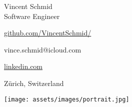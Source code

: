 \vspace{0pt}
\begin{minipage}[t]{0.6\textwidth}
    {\sectionfont\fontsize{20}{30}\selectfont\color{black}
        Vincent Schmid\\[0.2em]
    }
    {\sectionfont\fontsize{13}{14}\selectfont\color{altColor}
        Software Engineer\\[0.6em]
    }
    \begin{minipage}[t]{0.58\linewidth}
        \begin{description}[labelwidth=1em]
            \item[\faGithub\color{altColor}] \href{https://github.com/VincentSchmid/}{github.com/VincentSchmid/}
            \item[\faEnvelopeO\color{altColor}] vince.schmid@icloud.com
        \end{description}
        \vspace{.5em}
    \end{minipage}
    \hfill
    \begin{minipage}[t]{0.38\linewidth}
        \begin{description}[labelwidth=1em]
            \item[\faLinkedin\color{altColor}] \href{https://www.linkedin.com/in/vincent-schmid-b931787a/}{linkedin.com}
            \item[\faMapMarker\color{altColor}] Zürich, Switzerland
        \end{description}
    \end{minipage}
\end{minipage}
\hfill
\begin{minipage}[t]{0.38\textwidth}
    \vspace{0pt}
    \hfill\texttt{[image: assets/images/portrait.jpg]}
    \vspace{1.2em}
\end{minipage}
